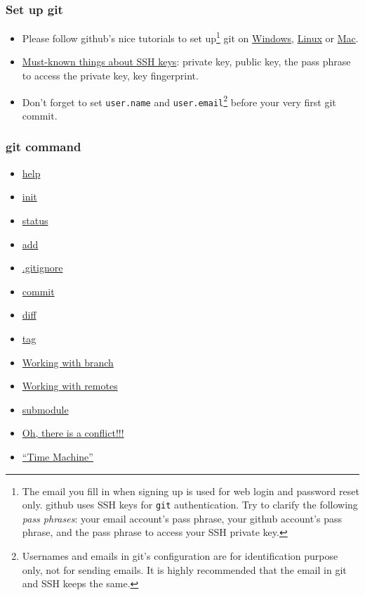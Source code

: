 \documentclass[11pt,ignorenonframetext,]{beamer}
\begin{document}
\begin{frame}[fragile]\frametitle{Set up git}

\begin{itemize}
\item
  Please follow github's nice tutorials to set up\footnote{The email you
    fill in when signing up is used for web login and password reset
    only. github uses SSH keys for \texttt{git} authentication. Try to
    clarify the following \emph{pass phrases}: your email account's pass
    phrase, your github account's pass phrase, and the pass phrase to
    access your SSH private key.} git on
  \href{http://help.github.com/win-set-up-git/}{Windows},
  \href{http://help.github.com/linux-set-up-git/}{Linux} or
  \href{http://help.github.com/mac-set-up-git/}{Mac}.
\item
  \href{http://linux.vbird.org/linux\_server/0310telnetssh.php\#ssh\_server}{Must-known
  things about SSH keys}: private key, public key, the pass phrase to
  access the private key, key fingerprint.
\item
  Don't forget to set \texttt{user.name} and
  \texttt{user.email}\footnote{Usernames and emails in git's
    configuration are for identification purpose only, not for sending
    emails. It is highly recommended that the email in git and SSH keeps
    the same.} before your very first git commit.
\end{itemize}
\end{frame}

\begin{frame}\frametitle{git command}

\begin{itemize}
	\item \hyperlink{githelp}{help}
	\item \hyperlink{gitinit}{init}
	\item \hyperlink{gitstatus}{status}
	\item \hyperlink{gitadd}{add}
	\item \hyperlink{gitignore}{.gitignore}
	\item \hyperlink{gitcommit}{commit}
	\item \hyperlink{gitdiff}{diff}
	\item \hyperlink{gittag}{tag}
	\item \hyperlink{gitbranch}{Working with branch}
	\item \hyperlink{gitremote}{Working with remotes}
	\item \hyperlink{gitsub}{submodule}
	\item \hyperlink{giconflict}{Oh, there is a conflict!!!}
	\item \hyperlink{gittime}{``Time Machine''}
\end{itemize}
\end{frame}
\end{document}
